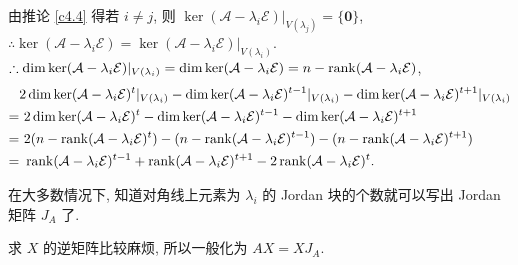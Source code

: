 \documentclass[color=black,device=normal,lang=cn,mode=geye]{elegantnote}
\begin{document}
由推论 \ref{c4.4} 得若 $i\neq j$, 则 $\ker(\mathcal{A}-\lambda_i\mathcal{E})|_{V(\lambda_j)}=\{\boldsymbol{0}\}$, $\therefore\ker(\mathcal{A}-\lambda_i\mathcal{E})=\ker(\mathcal{A}-\lambda_i\mathcal{E})|_{V(\lambda_i)}$. $\therefore\dim\ker(\mathcal{A}-\lambda_i\mathcal{E})|_{V(\lambda_i)}=\dim\ker(\mathcal{A}-\lambda_i\mathcal{E})=n-\operatorname{rank} (\mathcal{A}-\lambda_i\mathcal{E})$,
\begin{align*}
    & 2\dim\ker(\mathcal{A}-\lambda_i\mathcal{E})^t|_{V(\lambda_i)}-\dim\ker(\mathcal{A}-\lambda_i\mathcal{E})^{t-1}|_{V(\lambda_i)}-\dim\ker(\mathcal{A}-\lambda_i\mathcal{E})^{t+1}|_{V(\lambda_i)} \\
    = &\ 2\dim\ker(\mathcal{A}-\lambda_i\mathcal{E})^t-\dim\ker(\mathcal{A}-\lambda_i\mathcal{E})^{t-1}-\dim\ker(\mathcal{A}-\lambda_i\mathcal{E})^{t+1} \\
    = &\ 2(n-\rank (\mathcal{A}-\lambda_i\mathcal{E})^t)-(n-\rank (\mathcal{A}-\lambda_i\mathcal{E})^{t-1})-(n-\rank (\mathcal{A}-\lambda_i\mathcal{E})^{t+1}) \\
    = &\ \rank (\mathcal{A}-\lambda_i\mathcal{E})^{t-1}+\rank (\mathcal{A}-\lambda_i\mathcal{E})^{t+1}-2\rank (\mathcal{A}-\lambda_i\mathcal{E})^t.
\end{align*}

在大多数情况下, 知道对角线上元素为 $\lambda_i$ 的 Jordan 块的个数就可以写出 Jordan 矩阵 $J_A$ 了.

求 $X$ 的逆矩阵比较麻烦, 所以一般化为 $AX=XJ_A$.
\end{document}
